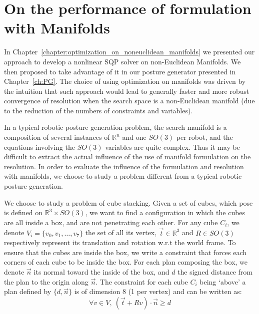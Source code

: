\section{On the performance of formulation with Manifolds}
\label{sec:On_the_performance_of_formulation_with_manifolds}

In Chapter~\ref{chapter:optimization_on_noneuclidean_manifolds} we presented our approach to develop a nonlinear SQP solver on non-Euclidean Manifolds.
We then proposed to take advantage of it in our posture generator presented in Chapter~\ref{ch:PG}.
The choice of using optimization on manifolds was driven by the intuition that such approach would lead to generally faster and more robust convergence of resolution when the search space is a non-Euclidean manifold (due to the reduction of the numbers of constraints and variables).

In a typical robotic posture generation problem, the search manifold is a composition of several instances of $\mathbb{R}^n$ and one $SO(3)$ per robot, and the equations involving the $SO(3)$ variables are quite complex.
Thus it may be difficult to extract the actual influence of the use of manifold formulation on the resolution.
In order to evaluate the influence of the formulation and resolution with manifolds, we choose to study a problem different from a typical robotic posture generation.

We choose to study a problem of cube stacking.
Given a set of cubes, which pose is defined on $\mathbb{R}^3 \times SO(3)$, we want to find a configuration in which the cubes are all inside a box, and are not penetrating each other.
For any cube $C_i$, we denote $V_i = \{v_0, v_1, \ldots, v_7\}$  the set of all its vertex, $\vec{t}\in\mathbb{R}^3$ and $R\in SO(3)$ respectively represent its translation and rotation w.r.t the world frame.
To ensure that the cubes are inside the box, we write a constraint that forces each corners of each cube to be inside the box.
For each plan composing the box, we denote $\vec{n}$ its normal toward the inside of the box, and $d$ the signed distance from the plan to the origin along $\vec{n}$.
The constraint for each cube $C_i$ being `above' a plan defined by $\{d, \vec{n}\}$ is of dimension 8 (1 per vertex) and can be written as:
\begin{equation}
  \forall v\in V,\ (\vec{t} + R v)\cdot \vec{n} \geq d
\end{equation}

